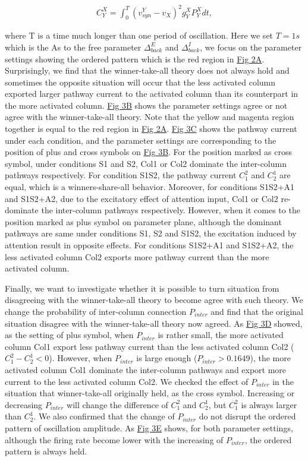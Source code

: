 \documentclass[10pt,letterpaper]{article}
\begin{document}
\begin{eqnarray}
\label{eq:6}
    C_{Y}^{X} = \int_{0}^{T}(v_{syn}^{Y}-v_{X})^{2}g_{Y}^{X}P_{Y}^{X}dt,
\end{eqnarray}

where T is a time much longer than one period of oscillation. Here we set $T=1s$ which is the As to the free parameter $\Delta_{back}^{E}$ and $\Delta_{back}^{I}$, we focus on the parameter settings showing the ordered pattern which is the red region in \hyperlink{fig:fig2}{Fig 2A}. Surprisingly, we find that the winner-take-all theory does not always hold and sometimes the opposite situation will occur that the less activated column exported larger pathway current to the activated column than its counterpart in the more activated column. \hyperlink{fig:fig3}{Fig 3B} shows the parameter settings agree or not agree with the winner-take-all theory. Note that the yellow and magenta region together is equal to the red region in \hyperlink{fig:fig2}{Fig 2A}. \hyperlink{fig:fig3}{Fig 3C} shows the pathway current under each condition, and the parameter settings are corresponding to the position of plus and cross symbols on \hyperlink{fig:fig3}{Fig 3B}. For the position marked as cross symbol, under conditions S1 and S2, Col1 or Col2 dominate the inter-column pathways respectively. For condition S1S2, the pathway current $C_{1}^{2}$ and $C_{2}^{1}$ are equal, which is a winners-share-all behavior. Moreover, for conditions S1S2+A1 and S1S2+A2, due to the excitatory effect of attention input, Col1 or Col2 re-dominate the inter-column pathways respectively. However, when it comes to the position marked as plus symbol on parameter plane, although the dominant pathways are same under conditions S1, S2 and S1S2, the excitation induced by attention result in opposite effects. For conditions S1S2+A1 and S1S2+A2, the less activated column Col2 exports more pathway current than the more activated column.

Finally, we want to investigate whether it is possible to turn situation from disagreeing with the winner-take-all theory to become agree with such theory. We change the probability of inter-column connection $P_{inter}$ and find that the original situation disagree with the winner-take-all theory now agreed. As \hyperlink{fig:fig3}{Fig 3D} showed, as the setting of plus symbol, when $P_{inter}$ is rather small, the more activated column Col1 export less pathway current than the less activated column Col2 ($C_{1}^{2} - C_{2}^{1} < 0$). However, when $P_{inter}$ is large enough ($P_{inter}>0.1649$), the more activated column Col1 dominate the inter-column pathways and export more current to the less activated column Col2. We checked the effect of $P_{inter}$ in the situation that winner-take-all originally held, as the cross symbol. Increasing or decreasing $P_{inter}$ will change the difference of $C_{1}^{2}$ and $C_{2}^{1}$, but $C_{1}^{2}$ is always larger than $C_{2}^{1}$. We also confirmed that the change of $P_{inter}$ do not disrupt the ordered pattern of oscillation amplitude. As \hyperlink{fig:fig3}{Fig 3E} shows, for both parameter settings, although the firing rate become lower with the increasing of $P_{inter}$, the ordered pattern is always held.
\end{document}
